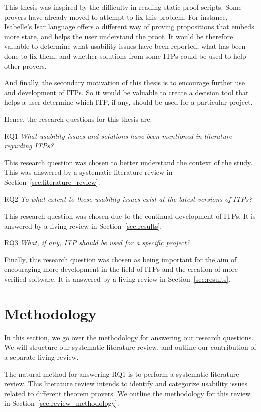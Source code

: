 \documentclass[
]{article}
\begin{document}
This thesis was inspired by the difficulty in reading static proof
scripts. Some provers have already moved to attempt to fix this problem.
For instance, Isabelle's Isar language offers a different way of proving
propositions that embeds more state, and helps the user understand the
proof. It would be therefore valuable to determine what usability issues
have been reported, what has been done to fix them, and whether
solutions from some ITPs could be used to help other provers.

And finally, the secondary motivation of this thesis is to encourage
further use and development of ITPs. So it would be valuable to create a
decision tool that helps a user determine which ITP, if any, should be
used for a particular project.

Hence, the research questions for this thesis are:

RQ1 \emph{What usability issues and solutions have been mentioned in
literature regarding ITPs?}

This research question was chosen to better understand the context of
the study. This was answered by a systematic literature review in
Section~\ref{sec:literature_review}.

RQ2 \emph{To what extent to these usability issues exist at the latest
versions of ITPs?}

This research question was chosen due to the continual development of
ITPs. It is answered by a living review in Section~\ref{sec:results}.

RQ3 \emph{What, if any, ITP should be used for a specific project?}

Finally, this research question was chosen as being important for the
aim of encouraging more development in the field of ITPs and the
creation of more verified software. It is answered by a living review in
Section~\ref{sec:results}.

\hypertarget{methodology}{%
\section{Methodology}\label{methodology}}

In this section, we go over the methodology for answering our research
questions. We will structure our systematic literature review, and
outline our contribution of a separate living review.

The natural method for answering RQ1 is to perform a systematic
literature review. This literature review intends to identify and
categorize usability issues related to different theorem provers. We
outline the methodology for this review in
Section~\ref{sec:review_methodology}.
\end{document}
